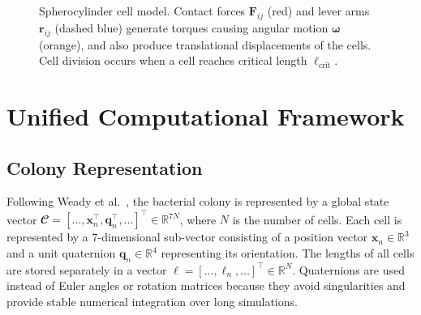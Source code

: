 \documentclass[conference]{IEEEtran}
\begin{document}
\begin{figure}[H]
    \caption{Spherocylinder cell model. Contact forces $\mathbf{F}_{ij}$ (red) and lever arms $\mathbf{r}_{ij}$ (dashed blue) generate torques causing angular motion $\boldsymbol{\omega}$ (orange), and also produce translational displacements of the cells. Cell division occurs when a cell reaches critical length $\ell_{\text{crit}}$.}
    \label{fig:spherocylinder_model}

\end{figure}

\newpage

\section{Unified Computational Framework}

\subsection{Colony Representation}

Following Weady et al.~\cite{Weady2024SM}, the bacterial colony is represented by a global state vector $\mathbfcal{C} = [\dots, \mathbf{x}_n^\top, \mathbf{q}_n^\top, \dots]^\top \in \mathbb{R}^{7N}$, where $N$ is the number of cells. Each cell is represented by a 7-dimensional sub-vector consisting of a position vector $\mathbf{x}_n \in \mathbb{R}^3$ and a unit quaternion $\mathbf{q}_n \in \mathbb{R}^4$ representing its orientation. The lengths of all cells are stored separately in a vector $\boldsymbol{\ell} = [\dots, \ell_n, \dots]^\top \in \mathbb{R}^{N}$. Quaternions are used instead of Euler angles or rotation matrices because they avoid singularities and provide stable numerical integration over long simulations.
\end{document}
